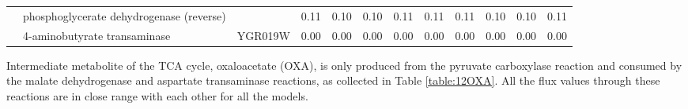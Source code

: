 \begin{table}[H]
{\begin{tabular}{clcccccccccc}
                        & phosphoglycerate dehydrogenase (reverse)                                                      &                                                           & 0.11      & 0.10      & 0.10     & 0.11                                                          & 0.11 & 0.11   & 0.10                                                      & 0.10   & 0.11     \\
                        & 4-aminobutyrate transaminase                                                                  & YGR019W                                                   & 0.00      & 0.00      & 0.00     & 0.00                                                          & 0.00 & 0.00   & 0.00                                                      & 0.00   & 0.00     \\ \hline
\end{tabular}}
\label{table:122KG}
\end{table}

Intermediate metabolite of the TCA cycle, oxaloacetate (OXA), is only produced from the pyruvate carboxylase reaction and consumed by the malate dehydrogenase and aspartate transaminase reactions, as collected in Table \ref{table:12OXA}. All the flux values through these reactions are in close range with each other for all the models.

